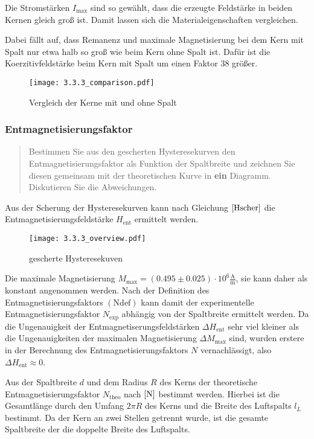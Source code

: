 \documentclass[12pt,a4paper]{scrartcl}
\numberwithin{equation}{section} %
\renewcommand{\[}{} %
\renewcommand{\]}{\noindent} %
\begin{document}
Die Stromstärken \(I_\mathrm{max}\) sind so gewählt, dass die erzeugte
Feldstärke in beiden Kernen gleich groß ist. Damit lassen sich die
Materialeigenschaften vergleichen.

Dabei fällt auf, dass Remanenz und maximale Magnetisierung bei dem Kern
mit Spalt nur etwa halb so groß wie beim Kern ohne Spalt ist. Dafür ist
die Koerzitivfeldstärke beim Kern mit Spalt um einen Faktor \(38\)
größer.

\begin{figure}
\centering
\texttt{[image: 3.3.3\_comparison.pdf]}
\caption{Vergleich der Kerne mit und ohne Spalt}
\end{figure}

\hypertarget{entmagnetisierungsfaktor-1}{%
\subsubsection{Entmagnetisierungsfaktor}\label{entmagnetisierungsfaktor-1}}

\begin{quote}
Bestimmen Sie aus den gescherten Hysteresekurven den
Entmagnetisierungsfaktor als Funktion der Spaltbreite und zeichnen Sie
diesen gemeinsam mit der theoretischen Kurve in \textbf{ein} Diagramm.
Diskutieren Sie die Abweichungen.
\end{quote}

Aus der Scherung der Hysteresekurven kann nach Gleichung
\(\eqref{Hscher}\) die Entmagnetisierungsfeldstärke \(H_\mathrm{ent}\)
ermittelt werden.

\begin{figure}
\centering
\texttt{[image: 3.3.3\_overview.pdf]}
\caption{gescherte Hysteresekuven}
\end{figure}

Die maximale Magnetisierung
\(M_\mathrm{max} = (0.495\pm 0.025) \cdot 10^6 \mathrm{\frac{A}{m}}\),
sie kann daher als konstant angenommen werden. Nach der Definition des
Entmagnetisierungsfaktors \((\mathrm{Ndef})\) kann damit der
experimentelle Entmagnetisierungsfaktor \(N_\mathrm{exp}\) abhängig von
der Spaltbreite ermittelt werden. Da die Ungenauigkeit der
Entmagnetiserungsfeldstärken \(\Delta H_\mathrm{ent}\) sehr viel kleiner
als die Ungenauigkeiten der maximalen Magnetisierung
\(\Delta M_\mathrm{max}\) sind, wurden erstere in der Berechnung des
Entmagnetisierungsfaktors \(N\) vernachlässigt, also
\(\Delta H_\mathrm{ent}\approx 0\).

Aus der Spaltbreite \(d\) und dem Radius \(R\) des Kerns der
theoretische Entmagnetisierungsfaktor \(N_\mathrm{theo}\) nach
\(\eqref{N}\) bestimmt werden. Hierbei ist die Gesamtlänge durch den
Umfang \(2\pi R\) des Kerns und die Breite des Luftspalts \(l_L\)
bestimmt. Da der Kern an zwei Stellen getrennt wurde, ist die gesamte
Spaltbreite der die doppelte Breite des Luftspalts.
\end{document}

